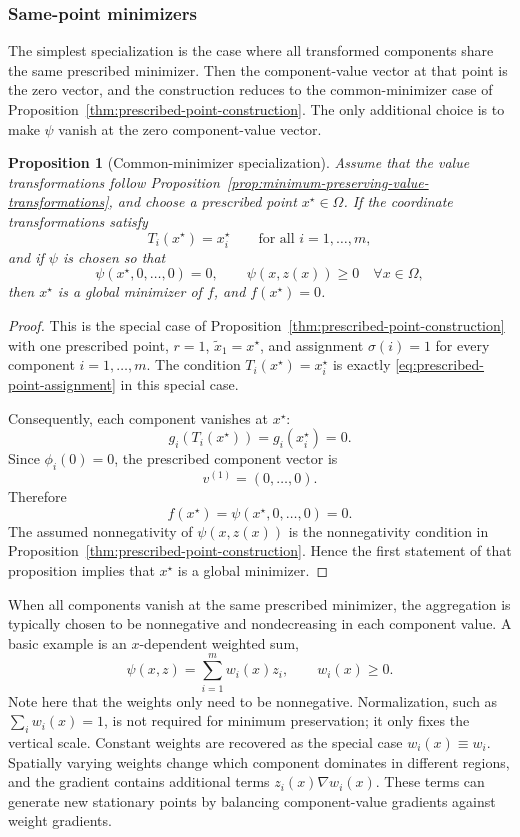 \documentclass[11pt,a4paper]{article}
\theoremstyle{remark}
\theoremstyle{plain}
\newtheorem{proposition}{Proposition}
\begin{document}
\subsubsection{Same-point minimizers}

The simplest specialization is the case where all transformed components share
the same prescribed minimizer. Then the component-value vector at that point is
the zero vector, and the construction reduces to the common-minimizer case of
Proposition~\ref{thm:prescribed-point-construction}. The only additional
choice is to make \(\psi\) vanish at the zero component-value vector.

\begin{proposition}[Common-minimizer specialization]
	\label{cor:common-vanishing-construction}
	Assume that the value transformations follow
	Proposition~\ref{prop:minimum-preserving-value-transformations}, and choose
	a prescribed point \(x^\star\in\Omega\). If the coordinate transformations
	satisfy
	\[
	T_i(x^\star)=x_i^\star
	\qquad
	\text{for all }i=1,\ldots,m,
	\]
	and if \(\psi\) is chosen so that
	\[
	\psi(x^\star,0,\ldots,0)=0,
	\qquad
	\psi(x,z(x))\ge0
	\quad
	\forall x\in\Omega,
	\]
	then \(x^\star\) is a global minimizer of \(f\), and \(f(x^\star)=0\).
\end{proposition}

\begin{proof}
	This is the special case of
	Proposition~\ref{thm:prescribed-point-construction} with one prescribed
	point, \(r=1\), \(\tilde x_1=x^\star\), and assignment
	\(\sigma(i)=1\) for every component \(i=1,\ldots,m\). The condition
	\(T_i(x^\star)=x_i^\star\) is exactly
	\eqref{eq:prescribed-point-assignment} in this special case.
	
	Consequently, each component vanishes at \(x^\star\):
	\[
	g_i(T_i(x^\star))=g_i(x_i^\star)=0.
	\]
	Since \(\phi_i(0)=0\), the prescribed component vector is
	\[
	v^{(1)}=(0,\ldots,0).
	\]
	Therefore
	\[
	f(x^\star)=\psi(x^\star,0,\ldots,0)=0.
	\]
	The assumed nonnegativity of \(\psi(x,z(x))\) is the nonnegativity condition
	in Proposition~\ref{thm:prescribed-point-construction}. Hence the first
	statement of that proposition implies that \(x^\star\) is a global minimizer.
\end{proof}

When all components vanish at the same prescribed minimizer, the aggregation is
typically chosen to be nonnegative and nondecreasing in each component value. A
basic example is an \(x\)-dependent weighted sum,
\[
	\psi(x,z)=\sum_{i=1}^m w_i(x)z_i,
	\qquad
	w_i(x)\ge0.
\]
Note here that the weights only
need to be nonnegative. Normalization, such as \(\sum_i w_i(x)=1\), is not
required for minimum preservation; it only fixes the vertical scale. Constant
weights are recovered as the special case \(w_i(x)\equiv w_i\). Spatially
varying weights change which component dominates in different regions, and the
gradient contains additional terms \(z_i(x)\nabla w_i(x)\). These terms can
generate new stationary points by balancing component-value gradients against
weight gradients.
\end{document}
